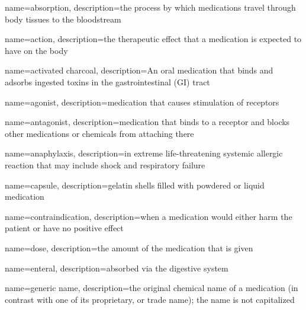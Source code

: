 \documentclass[../../EMT-169.tex]{subfiles}
\begin{document}
\setcounter{chapter}{10}
\label{ch:chapter11}
\clearpage
	
	
	{
		name=absorption,
		description={the process by which medications travel through body tissues to the bloodstream}
	}

	{
		name=action,
		description={the therapeutic effect that a medication is expected to have on the body}
	}

	{
		name=activated charcoal,
		description={An oral medication that binds and adsorbs ingested toxins in the gastrointestinal (GI) tract }
	}

	{
		name=agonist,
		description={medication that causes stimulation of receptors}
	}

	{
		name=antagonist,
		description={medication that binds to a receptor and blocks other medications or chemicals from attaching there}
	}

	{
		name=anaphylaxis,
		description={in extreme life-threatening systemic allergic reaction that may include shock and respiratory failure}
	}

	{
		name=capsule,
		description={gelatin shells filled with powdered or liquid medication}
	}

	{
		name=contraindication,
		description={when a medication would either harm the patient or have no positive effect}
	}


	{
		name=dose,
		description={the amount of the medication that is given}
	}

	{
		name=enteral,
		description={absorbed via the digestive system}
	}

	{
		name=generic name,
		description={the original chemical name of a medication (in contrast with one of its proprietary, or trade name); the name is not capitalized}
	}
\end{document}
